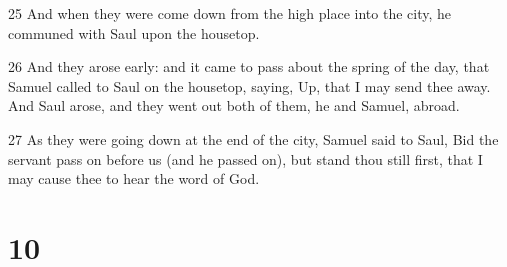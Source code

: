 \par 25 And when they were come down from the high place into the city, he communed with Saul upon the housetop.
\par 26 And they arose early: and it came to pass about the spring of the day, that Samuel called to Saul on the housetop, saying, Up, that I may send thee away. And Saul arose, and they went out both of them, he and Samuel, abroad.
\par 27 As they were going down at the end of the city, Samuel said to Saul, Bid the servant pass on before us (and he passed on), but stand thou still first, that I may cause thee to hear the word of God.

\chapter{10}

